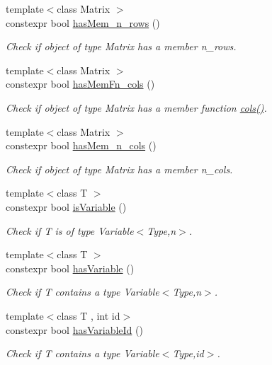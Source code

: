 \begin{DoxyCompactItemize}
{\footnotesize template$<$class Matrix $>$ }\\constexpr bool \hyperlink{group__Checks_ga6f66adbc63ed46140f1080e9914cb5de}{has\+Mem\+\_\+n\+\_\+rows} ()
\begin{DoxyCompactList}\small\item\em Check if object of type Matrix has a member n\+\_\+rows. \end{DoxyCompactList}\item 
{\footnotesize template$<$class Matrix $>$ }\\constexpr bool \hyperlink{group__Checks_ga4979df2d7b7abebb0253a569e41274b1}{has\+Mem\+Fn\+\_\+cols} ()
\begin{DoxyCompactList}\small\item\em Check if object of type Matrix has a member function \hyperlink{namespaceFunG_1_1LinearAlgebra_ae981b8bee32eea3ce87f41874835c9c1}{cols()}. \end{DoxyCompactList}\item 
{\footnotesize template$<$class Matrix $>$ }\\constexpr bool \hyperlink{group__Checks_ga0a87aaa714499abcaabd921297be61e4}{has\+Mem\+\_\+n\+\_\+cols} ()
\begin{DoxyCompactList}\small\item\em Check if object of type Matrix has a member n\+\_\+cols. \end{DoxyCompactList}\item 
{\footnotesize template$<$class T $>$ }\\constexpr bool \hyperlink{group__Checks_gac2a1a8aedf54c42cb6d47b3b64bbc761}{is\+Variable} ()
\begin{DoxyCompactList}\small\item\em Check if T is of type Variable$<$\+Type,n$>$. \end{DoxyCompactList}\item 
{\footnotesize template$<$class T $>$ }\\constexpr bool \hyperlink{group__Checks_ga6d289274975a662346a1b5adf0d31f37}{has\+Variable} ()
\begin{DoxyCompactList}\small\item\em Check if T contains a type Variable$<$\+Type,n$>$. \end{DoxyCompactList}\item 
{\footnotesize template$<$class T , int id$>$ }\\constexpr bool \hyperlink{group__Checks_ga0d42132679e0563893cc6c1809dc9a55}{has\+Variable\+Id} ()
\begin{DoxyCompactList}\small\item\em Check if T contains a type Variable$<$\+Type,id$>$. \end{DoxyCompactList}\item 

\end{DoxyCompactItemize}
